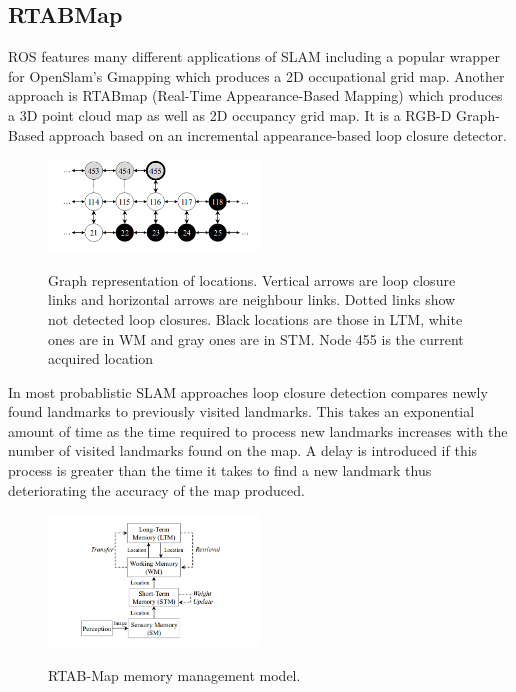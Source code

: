 \documentclass{mproj}
\begin{document}
\subsection{RTABMap}

ROS features many different applications of SLAM including a popular wrapper for OpenSlam's Gmapping which produces a 2D occupational grid map.\cite{gmapping} Another approach is RTABmap (Real-Time Appearance-Based Mapping) which produces a 3D point cloud map as well as 2D occupancy grid map. It is a RGB-D Graph-Based approach based on an incremental appearance-based loop closure detector. 

\begin{figure}[h]
  \caption{Graph  representation  of  locations.  Vertical  arrows  are  loop  closure
links and horizontal arrows are neighbour links. Dotted links show not detected
loop closures. Black locations are those in LTM, white ones are in WM and
gray ones are in STM. Node 455 is the current acquired location}
  \centering
  \includegraphics[width=0.5\textwidth]{images/graph.png}
  \label{fig:RTABMap Graph diagram}
\end{figure}

In most probablistic SLAM approaches loop closure detection compares newly found landmarks to previously visited landmarks. This takes an exponential amount of time as the time required to process new landmarks increases with the number of visited landmarks found on the map. A delay is introduced if this process is greater than the time it takes to find a new landmark thus deteriorating the accuracy of the map produced.
 
\begin{figure}[h]
  \caption{RTAB-Map memory management model.}
  \centering
  \includegraphics[width=0.5\textwidth]{images/memory.png}
  \label{fig:RTABMap Memory diagram}
\end{figure}
\end{document}

